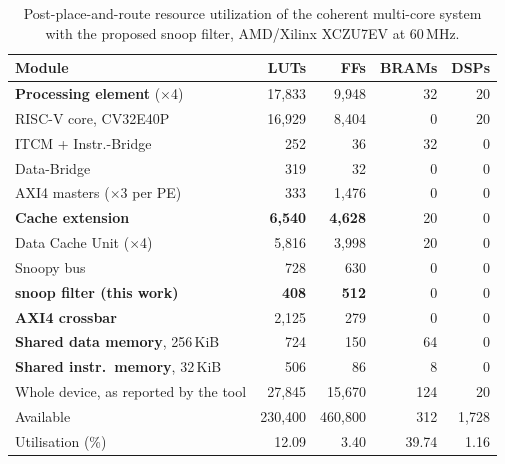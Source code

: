 \begin{table}[t]
\caption{Post-place-and-route resource utilization of the coherent multi-core
system with the proposed snoop filter, AMD/Xilinx XCZU7EV at 60\,MHz.}
\label{tab:fpga}
\centering
\scriptsize
\setlength{\tabcolsep}{3.5pt}
\begin{tabular}{@{}lrrrr@{}}
\toprule
Module & LUTs & FFs & BRAMs & DSPs \\
\midrule
\textbf{Processing element} ($\times$4)      & 17{,}833 & 9{,}948 & 32 & 20 \\
\quad RISC-V core, CV32E40P                  & 16{,}929 & 8{,}404 &  0 & 20 \\
\quad ITCM + Instr.-Bridge                   &      252 &      36 & 32 &  0 \\
\quad Data-Bridge                            &      319 &      32 &  0 &  0 \\
\quad AXI4 masters ($\times$3 per PE)        &      333 & 1{,}476 &  0 &  0 \\
\textbf{Cache extension}                     & \textbf{6{,}540} & \textbf{4{,}628} & 20 & 0 \\
\quad Data Cache Unit ($\times$4)            & 5{,}816 & 3{,}998 & 20 &  0 \\
\quad Snoopy bus                             &      728 &     630 &  0 &  0 \\
\quad\quad \textbf{snoop filter (this work)} & \textbf{408} & \textbf{512} & 0 & 0 \\
\textbf{AXI4 crossbar}                       & 2{,}125 &     279 &  0 &  0 \\
\textbf{Shared data memory}, 256\,KiB        &      724 &     150 & 64 &  0 \\
\textbf{Shared instr.\ memory}, 32\,KiB      &      506 &      86 &  8 &  0 \\
\midrule
Whole device, as reported by the tool        & 27{,}845 & 15{,}670 & 124 & 20 \\
Available                                    & 230{,}400 & 460{,}800 & 312 & 1{,}728 \\
Utilisation (\%)                             &    12.09 &     3.40 & 39.74 & 1.16 \\
\bottomrule
\end{tabular}
\end{table}
